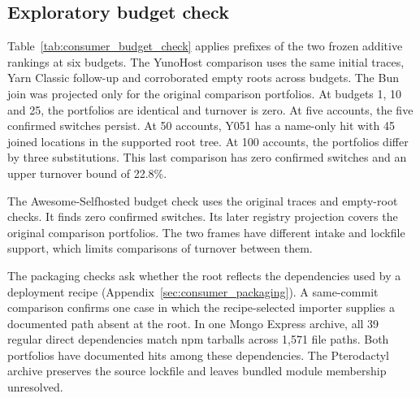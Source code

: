 \subsection{Exploratory budget check}
Table~\ref{tab:consumer_budget_check} applies prefixes of the two frozen additive rankings at six budgets. The YunoHost comparison uses the same initial traces, Yarn Classic follow-up and corroborated empty roots across budgets. The Bun join was projected only for the original comparison portfolios. At budgets 1, 10 and 25, the portfolios are identical and turnover is zero. At five accounts, the five confirmed switches persist. At 50 accounts, Y051 has a name-only hit with 45 joined locations in the supported root tree. At 100 accounts, the portfolios differ by three substitutions. This last comparison has zero confirmed switches and an upper turnover bound of 22.8\%.

The Awesome-Selfhosted budget check uses the original traces and empty-root checks. It finds zero confirmed switches. Its later registry projection covers the original comparison portfolios. The two frames have different intake and lockfile support, which limits comparisons of turnover between them.



The packaging checks ask whether the root reflects the dependencies used by a deployment recipe (Appendix~\ref{sec:consumer_packaging}). A same-commit comparison confirms one case in which the recipe-selected importer supplies a documented path absent at the root. In one Mongo Express archive, all 39 regular direct dependencies match npm tarballs across 1,571 file paths. Both portfolios have documented hits among these dependencies. The Pterodactyl archive preserves the source lockfile and leaves bundled module membership unresolved.
